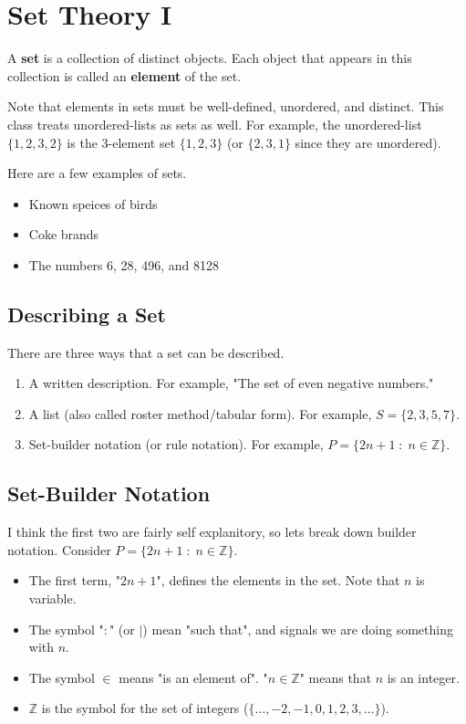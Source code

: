 \chapter{Set Theory I}

\mydefine
{
	A {\bf set} is a collection of distinct objects. Each object that appears in this collection is called an {\bf element} of the set.
}

Note that elements in sets must be well-defined, unordered, and distinct. This class treats unordered-lists as sets as well. For example, the unordered-list $\{1,2,3,2\}$ is the 3-element set $\{1,2,3\}$ (or $\{2,3,1\}$ since they are unordered).

\myexample
{
	Here are a few examples of sets.
	\begin{itemize}
		\item Known speices of birds
		\item Coke brands
		\item The numbers 6, 28, 496, and 8128
	\end{itemize}
}

\section{Describing a Set}

There are three ways that a set can be described.

\begin{enumerate}
	\item A written description. For example, "The set of even negative numbers."
	\item A list (also called roster method/tabular form). For example, $S = \{2,3,5,7\}$.
	\item Set-builder notation (or rule notation). For example, $P = \{2n+1\;:\;n \in \mathbb{Z}\}$.
\end{enumerate}

\section{Set-Builder Notation}

I think the first two are fairly self explanitory, so lets break down builder notation. Consider $P = \{2n+1\;:\;n \in \mathbb{Z}\}$.

\begin{itemize}
	\item The first term, "$2n+1$", defines the elements in the set. Note that $n$ is variable.
	\item The symbol "$:$" (or $|$) mean "such that", and signals we are doing something with $n$.
	\item The symbol $\in$ means "is an element of". "$n \in \mathbb{Z}$" means that $n$ is an integer.
	\item $\mathbb{Z}$ is the symbol for the set of integers ($\{\dots,-2,-1,0,1,2,3,\dots\}$).
\end{itemize}

